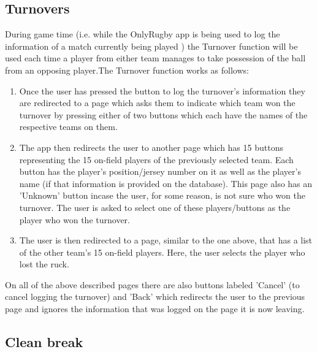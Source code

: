 \documentclass[hidelinks,a4paper,12pt]{article}
\begin{document}
	\subsection{Turnovers}
		During game time (i.e. while the OnlyRugby app is being used to log the information of a match currently being played ) the Turnover function will be used each time a player from either team manages to take possession of the ball from an opposing player.The Turnover function works as follows:
		\begin{enumerate}
			\item Once the user has pressed the button to log the turnover's information they are redirected to a page which asks them to indicate which team won the turnover by pressing either of two buttons which each
			have the names of the respective teams on them.
			\item The app then redirects the user to another page which has 15 buttons representing the 15 on-field players of the previously selected team. Each button has the player's position/jersey number on it 
			as well as the player's name (if that information is provided on the database). This page also has an 'Unknown' button incase the user, for some reason, is not sure who won the turnover. The user is asked to select one of these players/buttons as the player who won the turnover.
			\item The user is then redirected to a page, similar to the one above, that has a list of the other team's 15 on-field players. Here, the user selects the player who lost the ruck.
		\end{enumerate}
	On all of the above described pages there are also buttons labeled 'Cancel' (to cancel logging the turnover) and 'Back' which redirects the user to the previous page and ignores the information that was logged on the page it is now leaving.

	\subsection{Clean break}
\end{document}
